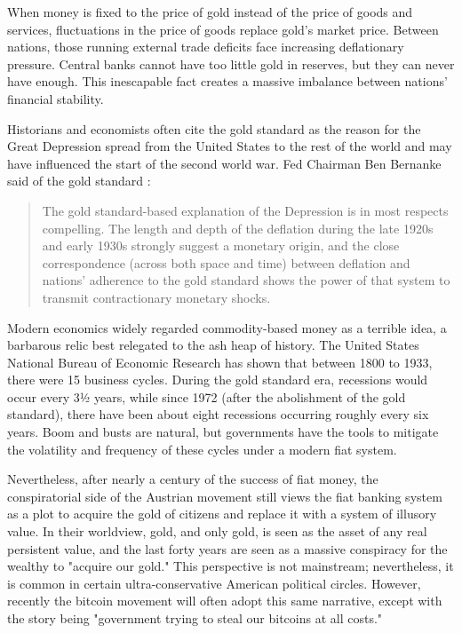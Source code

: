 When money is fixed to the price of gold instead of the price of goods and
services, fluctuations in the price of goods replace gold's market price.
Between nations, those running external trade deficits face increasing
deflationary pressure. Central banks cannot have too little gold in reserves,
but they can never have enough. This inescapable fact creates a massive
imbalance between nations' financial stability. \cite{roche2011understanding}


Historians and economists often cite the gold standard as the reason for the
Great Depression spread from the United States to the rest of the world and may
have influenced the start of the second world war. Fed Chairman Ben Bernanke
said of the gold standard \cite{Bernanke04}:

\begin{quote}
The gold standard-based explanation of the Depression is in most
respects compelling. The length and depth of the deflation during the
late 1920s and early 1930s strongly suggest a monetary origin, and the
close correspondence (across both space and time) between deflation and
nations' adherence to the gold standard shows the power of that system
to transmit contractionary monetary shocks.
\end{quote}

Modern economics widely regarded commodity-based money as a terrible idea, a
barbarous relic best relegated to the ash heap of history. The United States
National Bureau of Economic Research has shown that between 1800 to 1933, there
were 15 business cycles. During the gold standard era, recessions would occur
every 3½ years, while since 1972 (after the abolishment of the gold standard),
there have been about eight recessions occurring roughly every six years. Boom
and busts are natural, but governments have the tools to mitigate the volatility
and frequency of these cycles under a modern fiat system.

Nevertheless, after nearly a century of the success of fiat money, the
conspiratorial side of the Austrian movement still views the fiat banking system
as a plot to acquire the gold of citizens and replace it with a system of
illusory value. In their worldview, gold, and only gold, is seen as the asset of
any real persistent value, and the last forty years are seen as a massive
conspiracy for the wealthy to "acquire our gold." This perspective is not
mainstream; nevertheless, it is common in certain ultra-conservative American
political circles. However, recently the bitcoin movement will often adopt this
same narrative, except with the story being "government trying to steal our
bitcoins at all costs."

